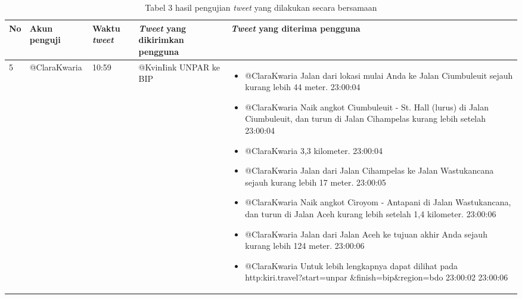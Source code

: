 \begin{enumerate}
\begin{table}[h]
	\caption{Tabel 3 hasil pengujian \textit{tweet} yang dilakukan secara bersamaan}
	\label{tab:tabelHasilPengujianTweetYangDilakukanSecaraBersamaan}
		\begin{tabular}{|p{0.5cm}|p{2.5cm}|p{1.5cm}|p{4cm}|p{6cm}|}
			\hline
				No & Akun penguji & Waktu \textit{tweet} & \textit{Tweet} yang dikirimkan pengguna & \textit{Tweet} yang diterima pengguna \\ \hline
				5 & @ClaraKwaria & 10:59 &  @KvinIink UNPAR ke BIP &
				\begin{itemize}
					\item @ClaraKwaria Jalan dari lokasi mulai Anda ke Jalan Ciumbuleuit sejauh kurang lebih 44 meter. 23:00:04
					\item @ClaraKwaria Naik angkot Ciumbuleuit - St. Hall (lurus) di Jalan Ciumbuleuit, dan turun di Jalan Cihampelas kurang lebih setelah 23:00:04
					\item @ClaraKwaria 3,3 kilometer. 23:00:04
					\item @ClaraKwaria Jalan dari Jalan Cihampelas ke Jalan Wastukancana sejauh kurang lebih 17 meter. 23:00:05
					\item @ClaraKwaria Naik angkot Ciroyom - Antapani di Jalan Wastukancana, dan turun di Jalan Aceh kurang lebih setelah 1,4 kilometer. 23:00:06
					\item @ClaraKwaria Jalan dari Jalan Aceh ke tujuan akhir Anda sejauh kurang lebih 124 meter. 23:00:06
					\item @ClaraKwaria Untuk lebih lengkapnya dapat dilihat pada http:\/\/kiri.travel?start=unpar \&finish=bip\&region=bdo 23:00:02 23:00:06
				\end{itemize} \\ \hline
		\end{tabular}
\end{table}


\end{enumerate}
